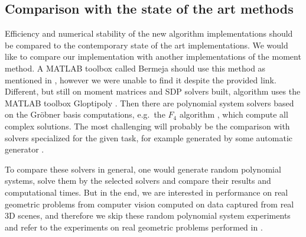 \subsection{Comparison with the state of the art methods}
Efficiency and numerical stability of the new algorithm implementations should be compared to the contemporary state of the art implementations.
We would like to compare our implementation with another implementations of the moment method. A MATLAB toolbox called Bermeja should use this method as mentioned in \cite{momentMethod}, however we were unable to find it despite the provided link.
Different, but still on moment matrices and SDP solvers built, algorithm uses the MATLAB toolbox Gloptipoly \cite{gloptipoly}.
Then there are polynomial system solvers based on the Gr\"obner basis computations, e.g.\ the $F_4$ algorithm \cite{F4}, which compute all complex solutions.
The most challenging will probably be the comparison with solvers specialized for the given task, for example generated by some automatic generator \cite{autogen}.

To compare these solvers in general, one would generate random polynomial systems, solve them by the selected solvers and compare their results and computational times.
But in the end, we are interested in performance on real geometric problems from computer vision computed on data captured from real 3D scenes, and therefore we skip these random polynomial system experiments and refer to the experiments on real geometric problems performed in .
